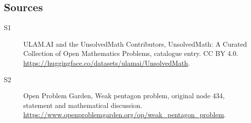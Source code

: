 \documentclass[11pt]{article}
\begin{document}
\subsection{Sources}
\begin{description}
\item[\hypertarget{source:statement:1}{S1}] ULAM.AI and the UnsolvedMath Contributors, UnsolvedMath: A Curated Collection of Open Mathematics Problems, catalogue entry. CC BY 4.0. \url{https://huggingface.co/datasets/ulamai/UnsolvedMath}.
\item[\hypertarget{source:statement:2}{S2}] Open Problem Garden, Weak pentagon problem, original node 434, statement and mathematical discussion. \url{https://www.openproblemgarden.org/op/weak_pentagon_problem}.
\end{description}
\label{end:statement}
\end{document}
